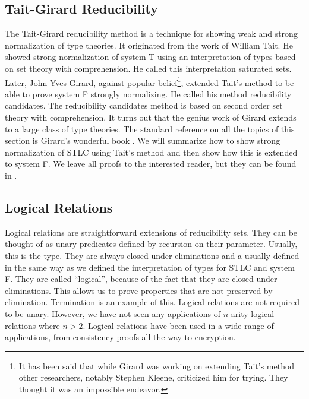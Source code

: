 \subsection{Tait-Girard Reducibility}
\label{subsec:tait-griard_reduciblity}
The Tait-Girard reducibility method is a technique for showing weak and
strong normalization of type theories.  It originated from the work of
William Tait.  He showed strong normalization of system T using an
interpretation of types based on set theory with comprehension.  He
called this interpretation saturated sets.  Later, John Yves Girard,
against popular belief\footnote{It has been said that while Girard was
  working on extending Tait's method other researchers, notably
  Stephen Kleene, criticized him for trying.  They thought it was an
  impossible endeavor.}, extended Tait's method to be able to prove
system F strongly normalizing.  He called his method reducibility
candidates. The reducibility candidates method is based on second order
set theory with comprehension.  It turns out that the genius work of
Girard extends to a large class of type theories. The standard
reference on all the topics of this section is Girard's wonderful book
\cite{Girard:1989}.  We will summarize how to show strong
normalization of STLC using Tait's method and then show how this is
extended to system F.  We leave all proofs to the interested reader,
but they can be found in \cite{Girard:1989}.





\subsection{Logical Relations}
\label{subsec:logical_relations}
Logical relations are straightforward extensions of reducibility sets.
They can be thought of as unary predicates defined by recursion on
their parameter.  Usually, this is the type.  They are always closed
under eliminations and a usually defined in the same way as we defined
the interpretation of types for STLC and system F.  They are called
``logical'', because of the fact that they are closed under
eliminations.  This allows us to prove properties that are not
preserved by elimination.  Termination is an example of this.  Logical
relations are not required to be unary.  However, we have not seen any
applications of $n$-arity logical relations where $n > 2$.  Logical
relations have been used in a wide range of applications, from
consistency proofs all the way to encryption.

